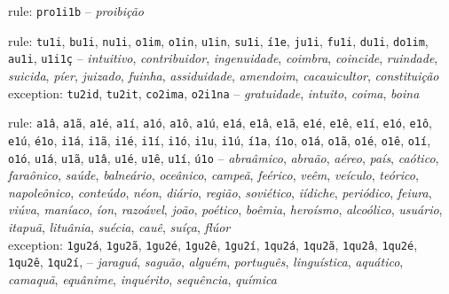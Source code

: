 \begin{rules}
\item\label{rulegrp_proi} rule: \texttt{pro1i1b} -- \emph{proibição}

\item\label{rulegrp_Vi} rule: \texttt{tu1i}, \texttt{bu1i}, \texttt{nu1i}, \texttt{o1im}, \texttt{o1in}, \texttt{u1in}, \texttt{su1i}, \texttt{í1e}, \texttt{ju1i}, \texttt{fu1i}, \texttt{du1i}, \texttt{do1im}, \texttt{au1i}, \texttt{u1i1ç} -- \emph{intuitivo}, \emph{contribuidor}, \emph{ingenuidade}, \emph{coimbra}, \emph{coincide}, \emph{ruindade}, \emph{suicida}, \emph{píer}, \emph{juizado}, \emph{fuinha}, \emph{assiduidade}, \emph{amendoim}, \emph{cacauicultor}, \emph{constituição} \\
exception: \texttt{tu2id}, \texttt{tu2it}, \texttt{co2ima}, \texttt{o2i1na} -- \emph{gratuidade}, \emph{intuito}, \emph{coima}, \emph{boina}

\item\label{rulegrp_aa} rule: \texttt{a1â}, \texttt{a1ã}, \texttt{a1é}, \texttt{a1í}, \texttt{a1ó}, \texttt{a1ô}, \texttt{a1ú}, \texttt{e1á}, \texttt{e1â}, \texttt{e1ã}, \texttt{e1é}, \texttt{e1ê}, \texttt{e1í}, \texttt{e1ó}, \texttt{e1ô}, \texttt{e1ú}, \texttt{é1o}, \texttt{i1á}, \texttt{i1ã}, \texttt{i1é}, \texttt{i1í}, \texttt{i1ó}, \texttt{i1u}, \texttt{i1ú}, \texttt{í1a}, \texttt{í1o}, \texttt{o1á}, \texttt{o1ã}, \texttt{o1é}, \texttt{o1ê}, \texttt{o1í}, \texttt{o1ó}, \texttt{u1á}, \texttt{u1ã}, \texttt{u1â}, \texttt{u1é}, \texttt{u1ê}, \texttt{u1í}, \texttt{ú1o} --  \emph{abraâmico}, \emph{abraão}, \emph{aéreo}, \emph{país}, \emph{caótico}, \emph{faraônico}, \emph{saúde}, \emph{balneário}, \emph{oceânico}, \emph{campeã}, \emph{feérico}, \emph{veêm}, \emph{veículo}, \emph{teórico}, \emph{napoleônico}, \emph{conteúdo}, \emph{néon}, \emph{diário}, \emph{região}, \emph{soviético}, \emph{iídiche}, \emph{periódico}, \emph{feiura}, \emph{viúva}, \emph{maníaco}, \emph{íon}, \emph{razoável}, \emph{joão}, \emph{poético}, \emph{boêmia}, \emph{heroísmo}, \emph{alcoólico}, \emph{usuário}, \emph{itapuã}, \emph{lituânia}, \emph{suécia}, \emph{cauê}, \emph{suíça}, \emph{flúor} \\
exception: \texttt{1gu2á}, \texttt{1gu2ã}, \texttt{1gu2é}, \texttt{1gu2ê}, \texttt{1gu2í}, \texttt{1qu2á}, \texttt{1qu2ã}, \texttt{1qu2â}, \texttt{1qu2é}, \texttt{1qu2ê}, \texttt{1qu2í}, -- \emph{jaraguá}, \emph{saguão}, \emph{alguém}, \emph{português}, \emph{linguística}, \emph{aquático}, \emph{camaquã}, \emph{equânime}, \emph{inquérito}, \emph{sequência}, \emph{química} 


\end{rules}
